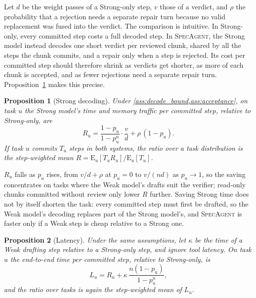 \documentclass[11pt, copyright, logo, secondlogo]{template/lark}
\newtheorem{proposition}{Proposition}
\newcommand{\SpecAgent}{\textsc{SpecAgent}\xspace}
\begin{document}
Let $d$ be the weight passes of a Strong-only step, $v$ those of a verdict,
and $\rho$ the probability that a rejection needs a separate repair turn
because no valid replacement was fused into the verdict. The comparison is
intuitive. In Strong-only, every committed step costs a full decoded
step. In \SpecAgent{}, the Strong model instead decodes one short verdict per
reviewed chunk, shared by all the steps the chunk commits, and a repair only
when a step is rejected. Its cost per committed step should therefore shrink
as verdicts get shorter, as more of each chunk is accepted, and as fewer
rejections need a separate repair turn.
Proposition~\ref{prop:strong_decode} makes this precise.

\begin{proposition}[Strong decoding]
\label{prop:strong_decode}
Under \cref{ass:decode_bound,ass:acceptance}, on task $u$ the Strong model's
time and memory traffic per committed step, relative to Strong-only, are
\begin{equation}
R_u=\frac{1-p_u}{1-p_u^n}\cdot\frac{v}{d}+\rho\,(1-p_u).
\label{eq:strong_ratio}
\end{equation}
If task $u$ commits $T_u$ steps in both systems, the ratio over a task
distribution is the step-weighted mean
$R=\mathrm{E}_u[T_uR_u]/\mathrm{E}_u[T_u]$.
\end{proposition}

$R_u$ falls as $p_u$ rises, from $v/d+\rho$ at $p_u=0$ to $v/(nd)$ as
$p_u\to1$, so the saving concentrates on tasks where the Weak model's drafts
suit the verifier; read-only chunks committed without review only lower $R$
further. Saving Strong time does not by itself shorten
the task: every committed step must first be drafted, so the Weak model's
decoding replaces part of the Strong model's, and \SpecAgent{} is faster only
if a Weak step is cheap relative to a Strong one.

\begin{proposition}[Latency]
\label{prop:latency}
Under the same assumptions, let $\kappa$ be the time of a Weak drafting step
relative to a Strong-only step, and ignore tool latency. On task $u$ the
end-to-end time per committed step, relative to Strong-only, is
\begin{equation}
L_u=R_u+\kappa\,\frac{n(1-p_u)}{1-p_u^n},
\label{eq:latency_ratio}
\end{equation}
and the ratio over tasks is again the step-weighted mean of $L_u$.
\end{proposition}
\end{document}
